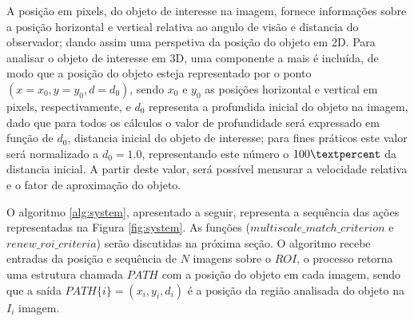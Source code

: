 A posição em pixels, do objeto de interesse na imagem, fornece informações 
sobre a posição horizontal e vertical relativa ao angulo de visão e 
distancia do observador; dando assim uma perspetiva 
da posição do objeto em 2D. Para analisar o objeto de interesse em 
3D, uma componente a mais é incluída, de modo que a posição do objeto esteja representado
por o ponto $(x=x_0, y=y_0, d=d_0)$, sendo $x_0$ e $y_0$ as posições 
horizontal e vertical em pixels, respectivamente, e $d_0$ representa a profundida inicial 
do objeto na imagem, dado que para todos os cálculos o valor de profundidade
será expressado em função de $d_0$, distancia inicial do objeto de interesse;
para fines práticos este valor será normalizado a $d_0=1.0$, representando este número
o $100\textpercent$ da distancia inicial. A partir
deste valor, será possível mensurar a velocidade relativa e o fator de aproximação do objeto.

O algoritmo \ref{alg:system}, apresentado a seguir, representa a sequência das 
ações representadas na Figura \ref{fig:system}. As funções 
 ($multiscale\_match\_criterion$ e $renew\_roi\_criteria$) serão discutidas na próxima seção. 
O algoritmo recebe entradas da posição e sequência de $N$ imagens sobre o $ROI$, o processo retorna 
uma estrutura chamada $PATH$ com a posição do objeto em cada imagem, sendo que a saída $PATH\{i\}=(x_i,y_i,d_i)$
é a posição da região analisada do objeto na $I_i$ imagem.



